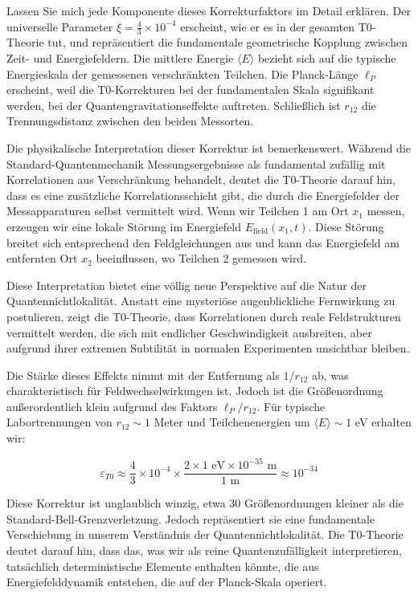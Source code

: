\documentclass[12pt,a4paper]{article}
\newcommand{\xipar}{\xi}
\theoremstyle{definition}
\theoremstyle{remark}
\begin{document}
Lassen Sie mich jede Komponente dieses Korrekturfaktors im Detail erklären. Der universelle Parameter $\xipar = \frac{4}{3} \times 10^{-4}$ erscheint, wie er es in der gesamten T0-Theorie tut, und repräsentiert die fundamentale geometrische Kopplung zwischen Zeit- und Energiefeldern. Die mittlere Energie $\langle E \rangle$ bezieht sich auf die typische Energieskala der gemessenen verschränkten Teilchen. Die Planck-Länge $\ell_P$ erscheint, weil die T0-Korrekturen bei der fundamentalen Skala signifikant werden, bei der Quantengravitationseffekte auftreten. Schließlich ist $r_{12}$ die Trennungsdistanz zwischen den beiden Messorten.

Die physikalische Interpretation dieser Korrektur ist bemerkenswert. Während die Standard-Quantenmechanik Messungsergebnisse als fundamental zufällig mit Korrelationen aus Verschränkung behandelt, deutet die T0-Theorie darauf hin, dass es eine zusätzliche Korrelationsschicht gibt, die durch die Energiefelder der Messapparaturen selbst vermittelt wird. Wenn wir Teilchen 1 am Ort $x_1$ messen, erzeugen wir eine lokale Störung im Energiefeld $E_{\text{field}}(x_1, t)$. Diese Störung breitet sich entsprechend den Feldgleichungen aus und kann das Energiefeld am entfernten Ort $x_2$ beeinflussen, wo Teilchen 2 gemessen wird.

Diese Interpretation bietet eine völlig neue Perspektive auf die Natur der Quantennichtlokalität. Anstatt eine mysteriöse augenblickliche Fernwirkung zu postulieren, zeigt die T0-Theorie, dass Korrelationen durch reale Feldstrukturen vermittelt werden, die sich mit endlicher Geschwindigkeit ausbreiten, aber aufgrund ihrer extremen Subtilität in normalen Experimenten unsichtbar bleiben.

Die Stärke dieses Effekts nimmt mit der Entfernung als $1/r_{12}$ ab, was charakteristisch für Feldwechselwirkungen ist. Jedoch ist die Größenordnung außerordentlich klein aufgrund des Faktors $\ell_P/r_{12}$. Für typische Labortrennungen von $r_{12} \sim 1$ Meter und Teilchenenergien um $\langle E \rangle \sim 1$ eV erhalten wir:

\begin{equation}
	\varepsilon_{T0} \approx \frac{4}{3} \times 10^{-4} \times \frac{2 \times 1 \text{ eV} \times 10^{-35} \text{ m}}{1 \text{ m}} \approx 10^{-34}
\end{equation}

Diese Korrektur ist unglaublich winzig, etwa 30 Größenordnungen kleiner als die Standard-Bell-Grenzverletzung. Jedoch repräsentiert sie eine fundamentale Verschiebung in unserem Verständnis der Quantennichtlokalität. Die T0-Theorie deutet darauf hin, dass das, was wir als reine Quantenzufälligkeit interpretieren, tatsächlich deterministische Elemente enthalten könnte, die aus Energiefelddynamik entstehen, die auf der Planck-Skala operiert.
\end{document}
